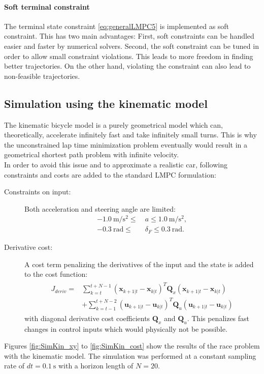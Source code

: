 \paragraph{Soft terminal constraint}
The terminal state constraint \eqref{eq:generalLMPC5} is implemented as soft constraint. This has two main advantages: First, soft constraints can be handled easier and faster by numerical solvers.
Second, the soft constraint can be tuned in order to allow small constraint violations. This leads to more freedom in finding better trajectories. On the other hand, violating the constraint can also lead to non-feasible trajectories.  
\subsection{Simulation using the kinematic model}
The kinematic bicycle model is a purely geometrical model which can, theoretically, accelerate infinitely fast and take infinitely small turns. This is why the unconstrained lap time minimization problem eventually would result in a geometrical shortest path problem with infinite velocity.\\
In order to avoid this issue and to approximate a realistic car, following constraints and costs are added to the standard LMPC formulation:
\begin{description}
\item[Constraints on input:] Both acceleration and steering angle are limited:
\begin{align*}
-\SI{1.0}{\meter\per\square\second} \leq\  &a \leq \SI{1.0}{\meter\per\square\second},\\
-\SI{0.3}{\radian} \leq\ &\delta_F \leq \SI{0.3}{\radian}.
\end{align*}
\item[Derivative cost:] A cost term penalizing the derivatives of the input and the state is added to the cost function:
\begin{align}
\begin{split}
J_{deriv} = &\sum_{k=t}^{t+N-1} (\bm{x}_{k+1|t}-\bm{x}_{k|t})^T \bm{Q}_x (\bm{x}_{k+1|t}-\bm{x}_{k|t})\\
&+\sum_{k=t-1}^{t+N-2} (\bm{u}_{k+1|t}-\bm{u}_{k|t})^T \bm{Q}_u (\bm{u}_{k+1|t}-\bm{u}_{k|t})
\end{split}
\end{align}
with diagonal derivative cost coefficients $\bm{Q}_x$ and $\bm{Q}_u$. This penalizes fast changes in control inputs which would physically not be possible.
\end{description}
Figures \ref{fig:SimKin_xy} to \ref{fig:SimKin_cost} show the results of the race problem with the kinematic model. The simulation was performed at a constant sampling rate of $dt=\SI{0.1}{\second}$ with a horizon length of $N=20$.

